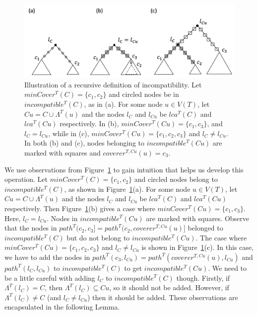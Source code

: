 \documentclass{article}
\newcommand{\leafset}{\Lambda}
\begin{document}
    \begin{figure}[ht]
        \includegraphics[scale=0.6]{incompatibilityrecursive}
        \centering
        \caption[Recursively defining incompatibility]{Illustration of a recursive definition of incompatibility. Let $minCover^{T}(C) = \{c_1, c_2\}$ and circled nodes be in $incompatible^{T}(C)$, as in (a). For some node $u \in V(T)$, let $Cu = C \cup \leafset^{T}(u)$ and the nodes $l_C$ and $l_{Cu}$ be $lca^{T}(C)$ and $lca^{T}(Cu)$ respectively. In (b), $minCover^{T}(Cu) = \{c_1, c_3\}$, and $l_C = l_{Cu}$, while in (c), $minCover^{T}(Cu) = \{c_1, c_2, c_3\}$ and $l_C \neq l_{Cu}$. In both (b) and (c), nodes belonging to $incompatible^{T}(Cu)$ are marked with squares and $coverer^{T, Cu}(u) = c_3$.}
        \label{fig:incompatibilityrecursive}
    \end{figure}

    We use observations from Figure~\ref{fig:incompatibilityrecursive} to gain intuition that helps us develop this operation. Let $minCover^{T}(C) = \{c_1, c_2\}$ and circled nodes belong to $incompatible^{T}(C)$, as shown in Figure~\ref{fig:incompatibilityrecursive}(a). For some node $u \in V(T)$, let $Cu = C \cup \leafset^{T}(u)$ and the nodes $l_C$ and $l_{Cu}$ be $lca^{T}(C)$ and $lca^{T}(Cu)$ respectively. Then Figure~\ref{fig:incompatibilityrecursive}(b) gives a case where $minCover^{T}(Cu) = \{c_1, c_3\}$. Here, $l_C = l_{Cu}$. Nodes in $incompatible^{T}(Cu)$ are marked with squares. Observe that the nodes in $path^{T}(c_2, c_3] = path^{T}(c_2, coverer^{T, Cu}(u)]$ belonged to $incompatible^{T}(C)$ but do not belong to $incompatible^{T}(Cu)$. The case where $minCover^{T}(Cu) = \{c_1, c_2, c_3\}$ and $l_C \neq l_{Cu}$ is shown in Figure~\ref{fig:incompatibilityrecursive}(c). In this case, we have to add the nodes in $path^{T}(c_3, l_{Cu}) = path^{T}(coverer^{T, Cu}(u), l_{Cu})$ and $path^{T}(l_C, l_{Cu})$ to $incompatible^{T}(C)$ to get $incompatible^{T}(Cu)$. We need to be a little careful with adding $l_C$ to $incompatible^{T}(C)$ though. Firstly, if $\leafset^{T}(l_C) = C$, then $\leafset^{T}(l_C) \subseteq Cu$, so it should not be added. However, if $\leafset^{T}(l_C) \neq C$ (and $l_C \neq l_{Cu}$) then it should be added. These observations are encapsulated in the following Lemma.
    \newline
\end{document}
